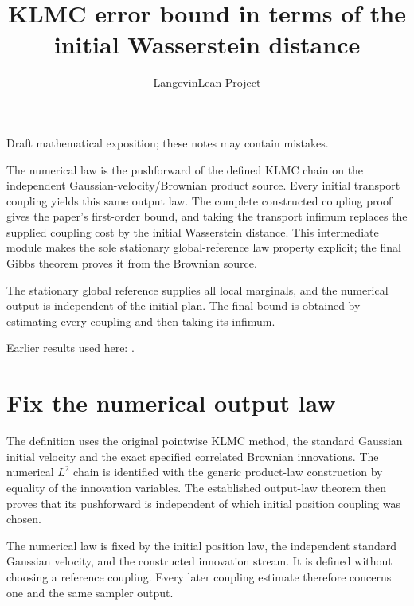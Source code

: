 \documentclass[11pt,a4paper]{article}
\title{\texorpdfstring{KLMC error bound in terms of the initial Wasserstein distance}{KLMC error bound in terms of the initial Wasserstein distance}}
\author{LangevinLean Project}
\date{}
\begin{document}
\maketitle
Draft mathematical exposition; these notes may contain mistakes.


The numerical law is the pushforward of the defined KLMC chain on the independent Gaussian-velocity/\allowbreak{}Brownian product source. Every initial transport coupling yields this same output law. The complete constructed coupling proof gives the paper's first-order bound, and taking the transport infimum replaces the supplied coupling cost by the initial Wasserstein distance. This intermediate module makes the sole stationary global-reference law property explicit; the final Gibbs theorem proves it from the Brownian source.



The stationary global reference supplies all local marginals, and the numerical output is independent of the initial plan. The final bound is obtained by estimating every coupling and then taking its infimum.



Earlier results used here: \cite[Section~3.18]{LangevinLean2026ULASC}.

\section{\texorpdfstring{Fix the numerical output law}{Fix the numerical output law}}


The definition uses the original pointwise KLMC method, the standard Gaussian initial velocity and the exact specified correlated Brownian innovations. The numerical \(L^{2}\) chain is identified with the generic product-law construction by equality of the innovation variables. The established output-law theorem then proves that its pushforward is independent of which initial position coupling was chosen.



The numerical law is fixed by the initial position law, the independent standard Gaussian velocity, and the constructed innovation stream. It is defined without choosing a reference coupling. Every later coupling estimate therefore concerns one and the same sampler output.
\end{document}
